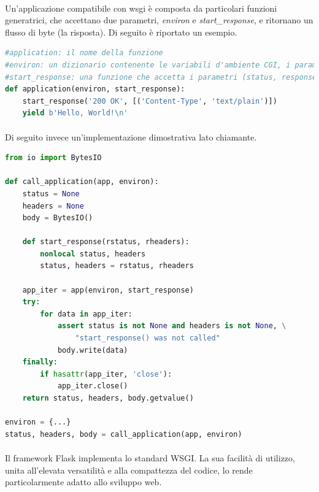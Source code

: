 \documentclass[12pt,a4paper,twoside,english,italian]{book}
\begin{document}
\paragraph{} Un'applicazione compatibile con wsgi è composta da particolari funzioni generatrici, che accettano due parametri, \emph{environ} e \emph{start\_response}, e ritornano un flusso di byte (la risposta). Di seguito è riportato un esempio.

\begin{lstlisting}[language=python, caption=Applicazione hello world]
#application: il nome della funzione
#environ: un dizionario contenente le variabili d'ambiente CGI, i parametri della richiesta e altri parametri user-defined
#start_response: una funzione che accetta i parametri (status, response_headers)
def application(environ, start_response):
    start_response('200 OK', [('Content-Type', 'text/plain')])
    yield b'Hello, World!\n'
\end{lstlisting}

\paragraph{} Di seguito invece un'implementazione dimostrativa lato chiamante. 

\begin{lstlisting}[language=python, caption=Implementazione dimostrativa chiamante]
from io import BytesIO

def call_application(app, environ):
    status = None
    headers = None
    body = BytesIO()
    
    def start_response(rstatus, rheaders):
        nonlocal status, headers
        status, headers = rstatus, rheaders
        
    app_iter = app(environ, start_response)
    try:
        for data in app_iter:
            assert status is not None and headers is not None, \
                "start_response() was not called"
            body.write(data)
    finally:
        if hasattr(app_iter, 'close'):
            app_iter.close()
    return status, headers, body.getvalue()

environ = {...} 
status, headers, body = call_application(app, environ)
\end{lstlisting}

\paragraph{} Il framework Flask implementa lo standard WSGI. La sua facilità di utilizzo, unita all'elevata versatilità e alla compattezza del codice, lo rende particolarmente adatto allo sviluppo web.
\end{document}
